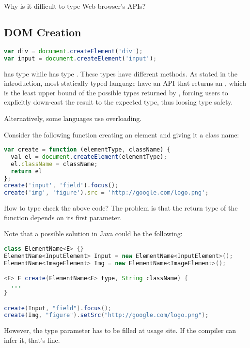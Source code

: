 \documentclass[runningheads,a4paper]{llncs}
\begin{document}
Why is it difficult to type Web browser’s APIs?

\subsection{DOM Creation}

\begin{lstlisting}[language=JavaScript]
var div = document.createElement('div');
var input = document.createElement('input');
\end{lstlisting}

 has type  while  has type . These types have different
methods. As stated in the introduction, most statically typed language have an API that returns an ,
which is the least upper bound of the possible types returned by , forcing users to explicitly
down-cast the result to the expected type, thus loosing type safety.

Alternatively, some languages use overloading.

Consider the following function creating an element and giving it a class name:

\begin{lstlisting}[language=JavaScript]
var create = function (elementType, className) {
  val el = document.createElement(elementType);
  el.className = className;
  return el
};
create('input', 'field').focus();
create('img', 'figure').src = 'http://google.com/logo.png';
\end{lstlisting}

How to type check the above code? The problem is that the return type of the  function depends on its
first parameter.

Note that a possible solution in Java could be the following:

\begin{lstlisting}[language=Java]
class ElementName<E> {}
ElementName<InputElement> Input = new ElementName<InputElement>();
ElementName<ImageElement> Img = new ElementName<ImageElement>();

<E> E create(ElementName<E> type, String className) {
  ...
}

create(Input, "field").focus();
create(Img, "figure").setSrc("http://google.com/logo.png");
\end{lstlisting}

However, the type parameter  has to be filled at usage site. If the compiler can infer it, that’s fine.
\end{document}

